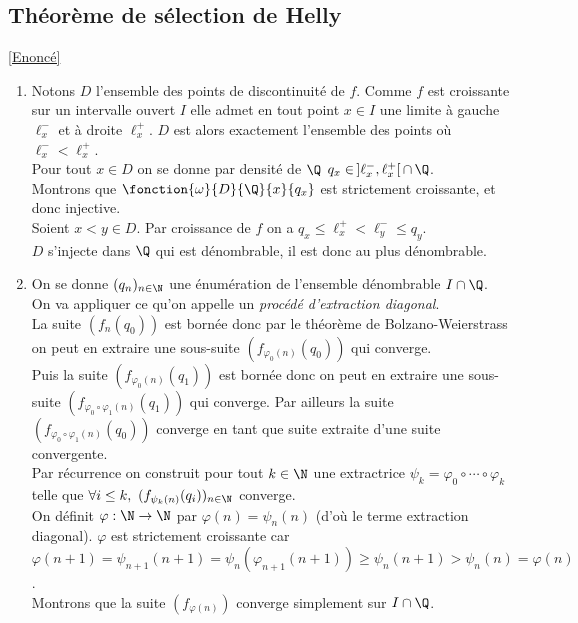 \documentclass{book}
\begin{document}
	\subsection{Théorème de sélection de Helly }
	\label{Théorème de sélection de Helly corrigé}
	\textcolor{blue}{\hyperref[Théorème de sélection de Helly]{[Enoncé]}}\\
	\begin{enumerate}[leftmargin=*]
		\item Notons $D$ l'ensemble des points de discontinuité de $f$. Comme $f$ est croissante sur un intervalle ouvert $I$ elle admet en tout point $x\in I$ une limite à gauche $\ell_x^-$ et à droite $\ell_x^+$. $D$ est alors exactement l'ensemble des points où $\ell_x^-<\ell_x^+$.\\
		Pour tout $x\in D$ on se donne par densité de $\Q$ $q_x\in\, ]\ell_x^-,\ell_x^+[\,\cap\, \Q$.\\
		Montrons que $\fonction{\omega}{D}{\Q}{x}{q_x}$ est strictement croissante, et donc injective.\\
		Soient $x<y\in D$. Par croissance de $f$ on a $q_x\leq \ell_x^+<\ell_y^-\leq q_y$.\\
		$D$ s'injecte dans $\Q$ qui est dénombrable, il est donc au plus dénombrable.
		\item On se donne $(q_n)_{n\in \N}$ une énumération de l'ensemble dénombrable $I\cap \Q$.\\
		On va appliquer ce qu'on appelle un \textit{procédé d'extraction diagonal}.\\
		La suite $(f_n(q_0))$ est bornée donc par le théorème de Bolzano-Weierstrass on peut en extraire une sous-suite $(f_{\varphi_0(n)}(q_0))$ qui converge.\\
		Puis la suite $(f_{\varphi_0(n)}(q_1))$ est bornée donc on peut en extraire une sous-suite $(f_{\varphi_0\circ\varphi_1(n)}(q_1))$ qui converge. Par ailleurs la suite $(f_{\varphi_0\circ \varphi_1(n)}(q_0))$ converge en tant que suite extraite d'une suite convergente.\\
		Par récurrence on construit pour tout $k\in \N$ une extractrice $\psi_k=\varphi_0\circ\cdots\circ\varphi_k$ telle que $\forall i\leq k,\ (f_{\psi_k(n)}(q_i))_{n\in \N}$ converge.\\
		On définit $\varphi:\N\to \N$ par $\varphi(n)=\psi_n(n)$ (d'où le terme extraction diagonal). $\varphi$ est strictement croissante car $\varphi(n+1)=\psi_{n+1}(n+1)=\psi_n(\varphi_{n+1}(n+1))\geq \psi_n(n+1)>\psi_n(n)=\varphi(n)$.\\
		Montrons que la suite $(f_{\varphi(n)})$ converge simplement sur $I\cap \Q$.\\

\end{enumerate}
\end{document}
